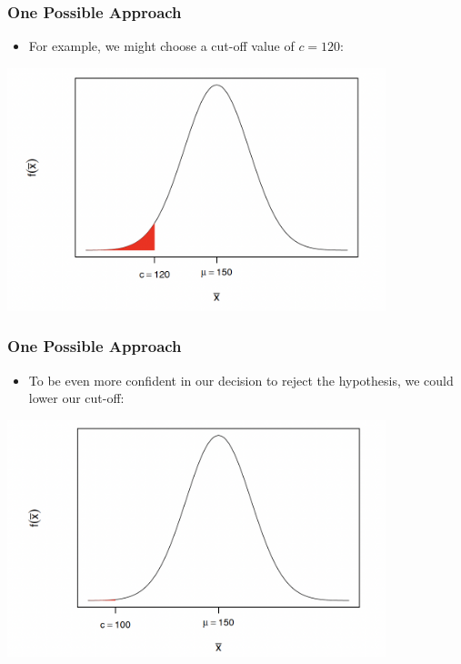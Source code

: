 \documentclass[12pt]{beamer}
\begin{document}
	\begin{frame}
	\frametitle{\color{blue}One Possible Approach}
	
	\begin{itemize}[label={\color{blue}$\blacktriangleright$}]
		\item For example, we might choose a cut-off value of $c = 120$:
	\end{itemize}
	\centering
	\includegraphics[width=11cm]{bowling1.png}
\end{frame}
	\begin{frame}
	\frametitle{\color{blue}One Possible Approach}
	
	\begin{itemize}[label={\color{blue}$\blacktriangleright$}]
		\item To be even more confident in our decision to reject the hypothesis, we could lower our cut-off:
	\end{itemize}
	\centering
	\includegraphics[width=11cm]{bowling2.png}
\end{frame}
\end{document}
